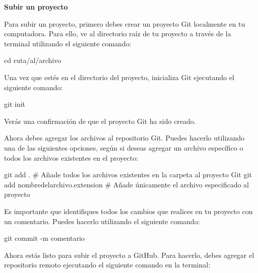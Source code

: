 \documentclass[
  a4paper,
]{article}
\newenvironment{Shaded}{}{}
\newcommand{\AttributeTok}[1]{\textcolor[rgb]{0.84,0.23,0.29}{#1}}
\newcommand{\BuiltInTok}[1]{\textcolor[rgb]{0.84,0.23,0.29}{#1}}
\newcommand{\CommentTok}[1]{\textcolor[rgb]{0.42,0.45,0.49}{#1}}
\newcommand{\FunctionTok}[1]{\textcolor[rgb]{0.44,0.26,0.76}{#1}}
\newcommand{\NormalTok}[1]{\textcolor[rgb]{0.14,0.16,0.18}{#1}}
\newcommand{\StringTok}[1]{\textcolor[rgb]{0.01,0.18,0.38}{#1}}
\begin{document}
\textbf{Subir un proyecto}

Para subir un proyecto, primero debes crear un proyecto Git localmente
en tu computadora. Para ello, ve al directorio raíz de tu proyecto a
través de la terminal utilizando el siguiente comando:

\begin{Shaded}
\begin{Highlighting}[]
\BuiltInTok{cd}\NormalTok{ ruta/al/archivo}
\end{Highlighting}
\end{Shaded}

Una vez que estés en el directorio del proyecto, inicializa Git
ejecutando el siguiente comando:

\begin{Shaded}
\begin{Highlighting}[]
\FunctionTok{git}\NormalTok{ init}
\end{Highlighting}
\end{Shaded}

Verás una confirmación de que el proyecto Git ha sido creado.

Ahora debes agregar los archivos al repositorio Git. Puedes hacerlo
utilizando una de las siguientes opciones, según si deseas agregar un
archivo específico o todos los archivos existentes en el proyecto:

\begin{Shaded}
\begin{Highlighting}[]
\FunctionTok{git}\NormalTok{ add .  }\CommentTok{\# Añade todos los archivos existentes en la carpeta al proyecto Git}
\FunctionTok{git}\NormalTok{ add nombredelarchivo.extension  }\CommentTok{\# Añade únicamente el archivo especificado al proyecto}
\end{Highlighting}
\end{Shaded}

Es importante que identifiques todos los cambios que realices en tu
proyecto con un comentario. Puedes hacerlo utilizando el siguiente
comando:

\begin{Shaded}
\begin{Highlighting}[]
\FunctionTok{git}\NormalTok{ commit }\AttributeTok{{-}m} \StringTok{\textquotesingle{}comentario\textquotesingle{}}
\end{Highlighting}
\end{Shaded}

Ahora estás listo para subir el proyecto a GitHub. Para hacerlo, debes
agregar el repositorio remoto ejecutando el siguiente comando en la
terminal:
\end{document}
